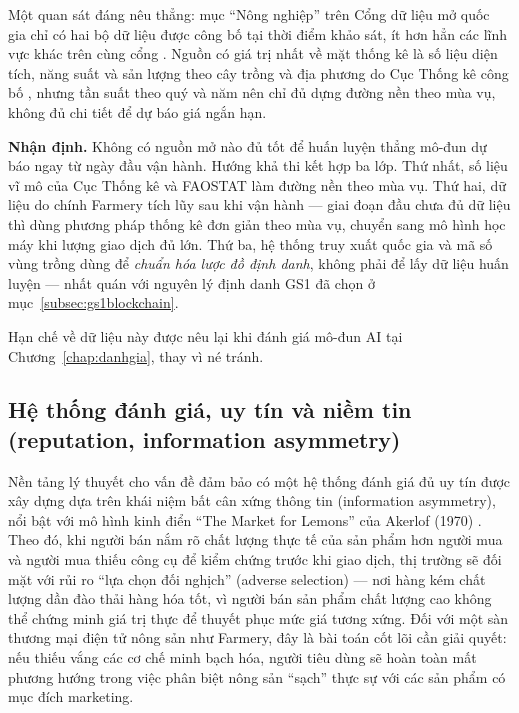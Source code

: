 Một quan sát đáng nêu thẳng: mục ``Nông nghiệp'' trên Cổng dữ liệu mở quốc gia chỉ có hai bộ dữ liệu được công bố tại thời điểm khảo sát, ít hơn hẳn các lĩnh vực khác trên cùng cổng \parencite{opendata_govvn}. Nguồn có giá trị nhất về mặt thống kê là số liệu diện tích, năng suất và sản lượng theo cây trồng và địa phương do Cục Thống kê công bố \parencite{cucthongke_nongnghiep}, nhưng tần suất theo quý và năm nên chỉ đủ dựng đường nền theo mùa vụ, không đủ chi tiết để dự báo giá ngắn hạn.

\noindent\textbf{Nhận định.} Không có nguồn mở nào đủ tốt để huấn luyện thẳng mô-đun dự báo ngay từ ngày đầu vận hành. Hướng khả thi kết hợp ba lớp. Thứ nhất, số liệu vĩ mô của Cục Thống kê và FAOSTAT làm đường nền theo mùa vụ. Thứ hai, dữ liệu do chính Farmery tích lũy sau khi vận hành --- giai đoạn đầu chưa đủ dữ liệu thì dùng phương pháp thống kê đơn giản theo mùa vụ, chuyển sang mô hình học máy khi lượng giao dịch đủ lớn. Thứ ba, hệ thống truy xuất quốc gia và mã số vùng trồng dùng để \emph{chuẩn hóa lược đồ định danh}, không phải để lấy dữ liệu huấn luyện --- nhất quán với nguyên lý định danh GS1 đã chọn ở mục~\ref{subsec:gs1blockchain}.

Hạn chế về dữ liệu này được nêu lại khi đánh giá mô-đun AI tại Chương~\ref{chap:danhgia}, thay vì né tránh.

\subsection{Hệ thống đánh giá, uy tín và niềm tin (reputation, information asymmetry)}
\label{subsec:reputation}

Nền tảng lý thuyết cho vấn đề đảm bảo có một hệ thống đánh giá đủ uy tín được xây dựng dựa trên khái niệm bất cân xứng thông tin (information asymmetry), nổi bật với mô hình kinh điển ``The Market for Lemons'' của Akerlof (1970) \parencite{akerlof1970lemons}. Theo đó, khi người bán nắm rõ chất lượng thực tế của sản phẩm hơn người mua và người mua thiếu công cụ để kiểm chứng trước khi giao dịch, thị trường sẽ đối mặt với rủi ro ``lựa chọn đối nghịch'' (adverse selection) --- nơi hàng kém chất lượng dần đào thải hàng hóa tốt, vì người bán sản phẩm chất lượng cao không thể chứng minh giá trị thực để thuyết phục mức giá tương xứng. Đối với một sàn thương mại điện tử nông sản như Farmery, đây là bài toán cốt lõi cần giải quyết: nếu thiếu vắng các cơ chế minh bạch hóa, người tiêu dùng sẽ hoàn toàn mất phương hướng trong việc phân biệt nông sản ``sạch'' thực sự với các sản phẩm có mục đích marketing.


